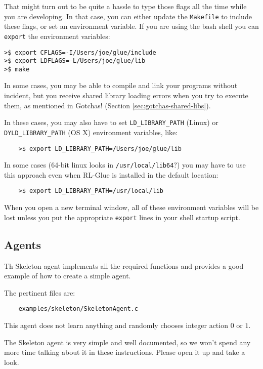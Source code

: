 \documentclass[11pt]{article}
\begin{document}
That might turn out to be quite a hassle to type those flags all the time while you are developing.  In that case, you can either update the \texttt{Makefile} to include these flags, 
or set an environment variable.  If you are using the bash shell you can \texttt{export} the environment variables:
\begin{verbatim}
>$ export CFLAGS=-I/Users/joe/glue/include
>$ export LDFLAGS=-L/Users/joe/glue/lib
>$ make
\end{verbatim}

In some cases, you may be able to compile and link your programs without incident, but you receive shared library loading errors when you try to execute them, as mentioned in Gotchas! (Section \ref{sec:gotchas-shared-libs}).

In these cases, you may also have to set \texttt{LD\_LIBRARY\_PATH} (Linux) or \texttt{DYLD\_LIBRARY\_PATH} (OS X) environment variables, like:
\begin{verbatim}
	>$ export LD_LIBRARY_PATH=/Users/joe/glue/lib
\end{verbatim}

In some cases (64-bit linux looks in \texttt{/usr/local/lib64}?) you may have to use this approach even when RL-Glue is installed in the default location:
\begin{verbatim}
	>$ export LD_LIBRARY_PATH=/usr/local/lib
\end{verbatim}

When you open a new terminal window, all of these environment variables will be lost unless you put the appropriate \texttt{export} lines in your shell startup script.




\subsection{Agents}
\label{sec:agent}
Th Skeleton agent implements all the required functions and provides a good example of how to create a simple agent.

The pertinent files are:
\begin{verbatim}
	examples/skeleton/SkeletonAgent.c
\end{verbatim}

This agent does not learn anything and randomly chooses integer action $0$ or $1$.

The Skeleton agent is very simple and well documented, so we won't spend any more time talking about it in these instructions.
Please open it up and take a look.
\end{document}
